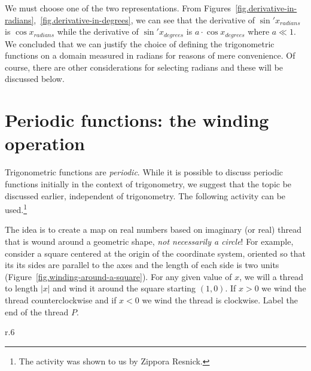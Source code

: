 We must choose one of the two representations.
From Figures~\ref{fig.derivative-in-radians},~\ref{fig.derivative-in-degrees}, we can see that the derivative of $\sin' x_{\textit{radians}}$ is $\cos x_{\textit{radians}}$ while the derivative of $\sin' x_{\textit{degrees}}$ is $a\cdot\cos x_{\textit{degrees}}$ where $a\ll 1$.
We concluded that we can justify the choice of defining the trigonometric functions on a domain measured in radians for reasons of mere convenience.
Of course, there are other considerations for selecting radians and these will be discussed below.

\section{Periodic functions: the winding operation}

Trigonometric functions are \emph{periodic}.
While it is possible to discuss periodic functions initially in the context of trigonometry, we suggest that the topic be discussed earlier, independent of trigonometry. The following activity can be used.\footnote{The activity was shown to us by Zippora Resnick.}

The idea is to create a map on real numbers based on imaginary (or real) thread that is wound around a geometric shape, \emph{not necessarily a circle}!
For example, consider a square centered at the origin of the coordinate system, oriented so that its its sides are parallel to the axes and the length of each side is two units (Figure~\ref{fig.winding-around-a-square}).
For any given value of $x$, we will a thread to length $|x|$ and wind it around the square starting $(1,0)$. If $x>0$ we wind the thread counterclockwise and if $x <0$ we wind the thread is clockwise.
Label the end of the thread $P$.

\begin{wrapfigure}[14]{r}{.6\textwidth}
\begin{center}
\caption{Winding a thread around a square}\label{fig.winding-around-a-square}
\end{center}
\end{wrapfigure}

